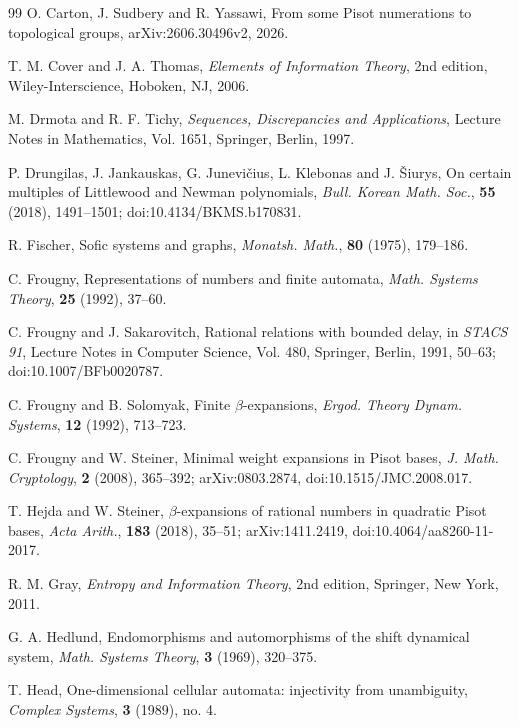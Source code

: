 \begin{thebibliography}{99}
O. Carton, J. Sudbery and R. Yassawi,
From some Pisot numerations to topological groups,
arXiv:2606.30496v2, 2026.

T. M. Cover and J. A. Thomas, \textit{Elements of Information Theory}, 2nd edition, Wiley-Interscience, Hoboken, NJ, 2006.

M. Drmota and R. F. Tichy, \textit{Sequences, Discrepancies and Applications}, Lecture Notes in Mathematics, Vol. 1651, Springer, Berlin, 1997.

P. Drungilas, J. Jankauskas, G. Junevi\v{c}ius, L. Klebonas and J. \v{S}iurys,
On certain multiples of Littlewood and Newman polynomials,
\textit{Bull. Korean Math. Soc.}, \textbf{55} (2018), 1491--1501;
doi:10.4134/BKMS.b170831.

R. Fischer, Sofic systems and graphs, \textit{Monatsh. Math.}, \textbf{80} (1975), 179--186.

C. Frougny, Representations of numbers and finite automata, \textit{Math. Systems Theory}, \textbf{25} (1992), 37--60.

C. Frougny and J. Sakarovitch, Rational relations with bounded delay,
in \textit{STACS 91}, Lecture Notes in Computer Science, Vol. 480,
Springer, Berlin, 1991, 50--63; doi:10.1007/BFb0020787.

C. Frougny and B. Solomyak, Finite $\beta$-expansions,
\textit{Ergod. Theory Dynam. Systems}, \textbf{12} (1992), 713--723.

C. Frougny and W. Steiner, Minimal weight expansions in Pisot bases,
\textit{J. Math. Cryptology}, \textbf{2} (2008), 365--392;
arXiv:0803.2874, doi:10.1515/JMC.2008.017.

T. Hejda and W. Steiner, $\beta$-expansions of rational numbers in quadratic
Pisot bases, \textit{Acta Arith.}, \textbf{183} (2018), 35--51;
arXiv:1411.2419, doi:10.4064/aa8260-11-2017.

R. M. Gray, \textit{Entropy and Information Theory}, 2nd edition, Springer,
New York, 2011.

G. A. Hedlund, Endomorphisms and automorphisms of the shift dynamical system, \textit{Math. Systems Theory}, \textbf{3} (1969), 320--375.

T. Head, One-dimensional cellular automata: injectivity from unambiguity,
\textit{Complex Systems}, \textbf{3} (1989), no. 4.


\end{thebibliography}
